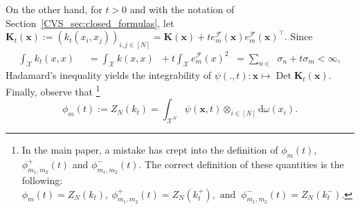 \documentclass[twoside,11pt]{book}
\numberwithin{theorem}{chapter}
\numberwithin{definition}{chapter}
\numberwithin{proposition}{chapter}
\numberwithin{corollary}{chapter}
\numberwithin{example}{chapter}
\numberwithin{lemma}{chapter}
\numberwithin{assumption}{chapter}
\numberwithin{equation}{chapter}
\numberwithin{figure}{chapter}
\DeclareMathOperator{\Det}{Det}
\DeclareMathOperator{\Tran}{\intercal}
\DeclareMathOperator{\F}{\mathcal{F}}
\DeclareMathOperator{\X}{\mathcal{X}}
\DeclareMathOperator{\Mu}{\mathrm{d}\omega(x)}
\DeclareMathOperator{\Ns}{\mathbb{N}^{*}}
\begin{document}
On the other hand, for $t>0$ and with the notation of Section~\ref{CVS_sec:closed_formulas}, let $ \bm{K}_{t}(\bm{x}) := (k_{t}(x_{i},x_{j}))_{i,j \in [N]} = \bm{K}(\bm{x})+t e_{m}^{\mathcal{F}}(\bm{x})e_{m}^{\mathcal{F}}(\bm{x})^{\Tran}$.
Since
\begin{align}
\int_{\X} k_{t}(x,x) \Mu
& = \int_{\X} k(x,x) \Mu + t \int_{\X} e_{m}^{\F}(x)^{2} \Mu = \sum\limits_{n \in \Ns} \sigma_{n} + t \sigma_{m} < \infty,
\end{align}
Hadamard's inequality yields the integrability of
$
\psi(.,t): \bm{x} \mapsto \Det \bm{K}_{t}(\bm{x}).
$
Finally, observe that \footnote{In the main paper, a mistake has crept into the definition of $\phi_{m}(t)$, $\phi_{m_{1},m_{2}}^{+}(t)$ and $\phi_{m_{1},m_{2}}^{-}(t)$. The correct definition of these quantities is the following: $
\phi_{m}(t) = Z_{N}(k_{t}) , \: \phi_{m_{1},m_{2}}^{+}(t) = Z_{N}(k_{t}^{+}),  \text{ and }\: \phi_{m_{1},m_{2}}^{-}(t) = Z_{N}(k_{t}^{-}). $}
\begin{equation}
\phi_{m}(t) := Z_N(k_t) =  \int_{\X^{N}} \psi(\bm{x},t) \otimes_{i \in [N]} \mathrm{d}\omega(x_{i}).
\end{equation}
\end{document}
